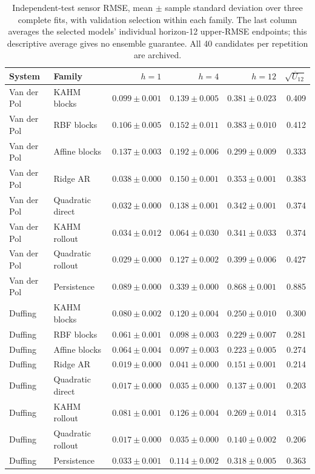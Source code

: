 \begin{table}[t]
\centering\small
\setlength{\tabcolsep}{3pt}
\begin{tabular}{llrrrr}
\toprule
System & Family & $h=1$ & $h=4$ & $h=12$ & $\overline{\sqrt{U_{12}}}$ \\
\midrule
Van der Pol & KAHM blocks & $0.099\pm0.001$ & $0.139\pm0.005$ & $0.381\pm0.023$ & 0.409 \\
Van der Pol & RBF blocks & $0.106\pm0.005$ & $0.152\pm0.011$ & $0.383\pm0.010$ & 0.412 \\
Van der Pol & Affine blocks & $0.137\pm0.003$ & $0.192\pm0.006$ & $0.299\pm0.009$ & 0.333 \\
Van der Pol & Ridge AR & $0.038\pm0.000$ & $0.150\pm0.001$ & $0.353\pm0.001$ & 0.383 \\
Van der Pol & Quadratic direct & $0.032\pm0.000$ & $0.138\pm0.001$ & $0.342\pm0.001$ & 0.374 \\
Van der Pol & KAHM rollout & $0.034\pm0.012$ & $0.064\pm0.030$ & $0.341\pm0.033$ & 0.374 \\
Van der Pol & Quadratic rollout & $0.029\pm0.000$ & $0.127\pm0.002$ & $0.399\pm0.006$ & 0.427 \\
Van der Pol & Persistence & $0.089\pm0.000$ & $0.339\pm0.000$ & $0.868\pm0.001$ & 0.885 \\
Duffing & KAHM blocks & $0.080\pm0.002$ & $0.120\pm0.004$ & $0.250\pm0.010$ & 0.300 \\
Duffing & RBF blocks & $0.061\pm0.001$ & $0.098\pm0.003$ & $0.229\pm0.007$ & 0.281 \\
Duffing & Affine blocks & $0.064\pm0.004$ & $0.097\pm0.003$ & $0.223\pm0.005$ & 0.274 \\
Duffing & Ridge AR & $0.019\pm0.000$ & $0.041\pm0.000$ & $0.151\pm0.001$ & 0.214 \\
Duffing & Quadratic direct & $0.017\pm0.000$ & $0.035\pm0.000$ & $0.137\pm0.001$ & 0.203 \\
Duffing & KAHM rollout & $0.081\pm0.001$ & $0.126\pm0.004$ & $0.269\pm0.014$ & 0.315 \\
Duffing & Quadratic rollout & $0.017\pm0.000$ & $0.035\pm0.000$ & $0.140\pm0.002$ & 0.206 \\
Duffing & Persistence & $0.033\pm0.001$ & $0.114\pm0.002$ & $0.318\pm0.005$ & 0.363 \\
\bottomrule
\end{tabular}

\caption{Independent-test sensor RMSE, mean $\pm$ sample standard deviation
over three complete fits, with validation selection within each family.
The last column averages the selected models' individual horizon-12
upper-RMSE endpoints; this descriptive average gives no ensemble guarantee.
All 40 candidates per repetition are archived.}
\label{tab:oscillators}
\end{table}

